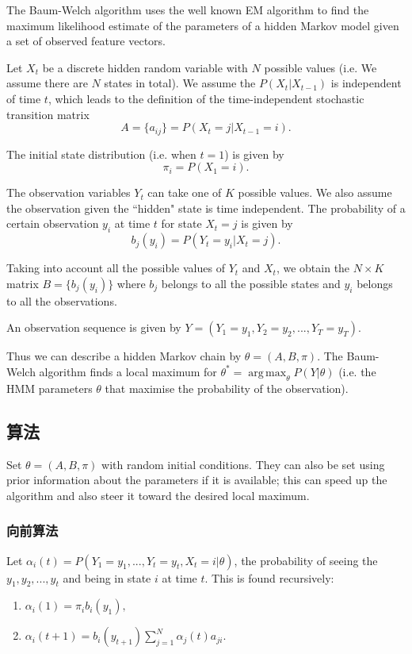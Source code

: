 The Baum-Welch algorithm uses the well known EM algorithm to find the maximum likelihood estimate of the parameters of a hidden Markov model given a set of observed feature vectors.

Let $X_{t}$ be a discrete hidden random variable with $N$ possible values (i.e. We assume there are $N$ states in total).
We assume the $P(X_{t}|X_{t-1})$ is independent of time $t$, which leads to the definition of
the time-independent stochastic transition matrix
\[
    A=\{a_{ij}\}=P(X_{t}=j|X_{t-1}=i).
\]

The initial state distribution (i.e. when $t=1$) is given by
\[
\pi _{i}=P(X_{1}=i).
\]

The observation variables $Y_{t}$ can take one of $K$ possible values.
We also assume the observation given the ``hidden" state is time independent.
The probability of a certain observation $y_{i}$ at time $t$ for state $X_{t}=j$ is given by
\[
    b_{j}(y_{i})=P(Y_{t}=y_{i}|X_{t}=j).
\]

Taking into account all the possible values of $Y_{t}$ and $X_{t}$, we obtain the $N\times K$ matrix
$B=\{b_j(y_i)\}$ where $b_{j}$ belongs to all the possible states and $y_{i}$ belongs to all the observations.

An observation sequence is given by $Y=(Y_{1}=y_{1},Y_{2}=y_{2},...,Y_{T}=y_{T}).$

Thus we can describe a hidden Markov chain by $\theta =(A,B,\pi).$
The Baum-Welch algorithm finds a local maximum for $\theta^{*}=\operatorname {arg\,max}_{\theta}P(Y|\theta)$ 
(i.e. the HMM parameters $\theta$ that maximise the probability of the observation).

\subsection{算法}
Set $\theta =(A,B,\pi )$ with random initial conditions. They can also be set using prior information about the parameters if it is available; this can speed up the algorithm and also steer it toward the desired local maximum.

\subsubsection{向前算法}
Let $\alpha_{i}(t)=P(Y_{1}=y_{1},...,Y_{t}=y_{t},X_{t}=i|\theta )$, the probability of seeing the
$y_{1},y_{2},...,y_{t}$ and being in state $i$ at time $t$. This is found recursively:
\begin{enumerate}
    \item ${\displaystyle \alpha _{i}(1)=\pi _{i}b_{i}(y_{1}),}$
    \item ${\displaystyle \alpha _{i}(t+1)=b_{i}(y_{t+1})\sum _{j=1}^{N}\alpha _{j}(t)a_{ji}.}$
\end{enumerate}


